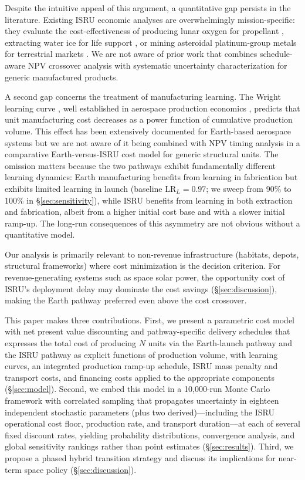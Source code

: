 \documentclass[preprint,12pt]{elsarticle}
\begin{document}
Despite the intuitive appeal of this argument, a quantitative gap persists in the literature. Existing ISRU economic analyses are overwhelmingly mission-specific: they evaluate the cost-effectiveness of producing lunar oxygen for propellant \cite{sanders2015}, extracting water ice for life support \cite{zubrin1996}, or mining asteroidal platinum-group metals for terrestrial markets \cite{sonter1997,elvis2012}. We are not aware of prior work that combines schedule-aware NPV crossover analysis with systematic uncertainty characterization for generic manufactured products.

A second gap concerns the treatment of manufacturing learning. The Wright learning curve \cite{wright1936}, well established in aerospace production economics \cite{wertz2011}, predicts that unit manufacturing cost decreases as a power function of cumulative production volume. This effect has been extensively documented for Earth-based aerospace systems \cite{argote1990,nagy2013} but we are not aware of it being combined with NPV timing analysis in a comparative Earth-versus-ISRU cost model for generic structural units. The omission matters because the two pathways exhibit fundamentally different learning dynamics: Earth manufacturing benefits from learning in fabrication but exhibits limited learning in launch (baseline $\mathrm{LR}_L = 0.97$; we sweep from 90\% to 100\% in \S\ref{sec:sensitivity}), while ISRU benefits from learning in both extraction and fabrication, albeit from a higher initial cost base and with a slower initial ramp-up. The long-run consequences of this asymmetry are not obvious without a quantitative model.

Our analysis is primarily relevant to non-revenue infrastructure (habitats, depots, structural frameworks) where cost minimization is the decision criterion. For revenue-generating systems such as space solar power, the opportunity cost of ISRU's deployment delay may dominate the cost savings (\S\ref{sec:discussion}), making the Earth pathway preferred even above the cost crossover.

This paper makes three contributions. First, we present a parametric cost model with net present value discounting and pathway-specific delivery schedules that expresses the total cost of producing $N$ units via the Earth-launch pathway and the ISRU pathway as explicit functions of production volume, with learning curves, an integrated production ramp-up schedule, ISRU mass penalty and transport costs, and financing costs applied to the appropriate components (\S\ref{sec:model}). Second, we embed this model in a 10{,}000-run Monte Carlo framework with correlated sampling that propagates uncertainty in eighteen independent stochastic parameters (plus two derived)---including the ISRU operational cost floor, production rate, and transport duration---at each of several fixed discount rates, yielding probability distributions, convergence analysis, and global sensitivity rankings rather than point estimates (\S\ref{sec:results}). Third, we propose a phased hybrid transition strategy and discuss its implications for near-term space policy (\S\ref{sec:discussion}).
\end{document}
